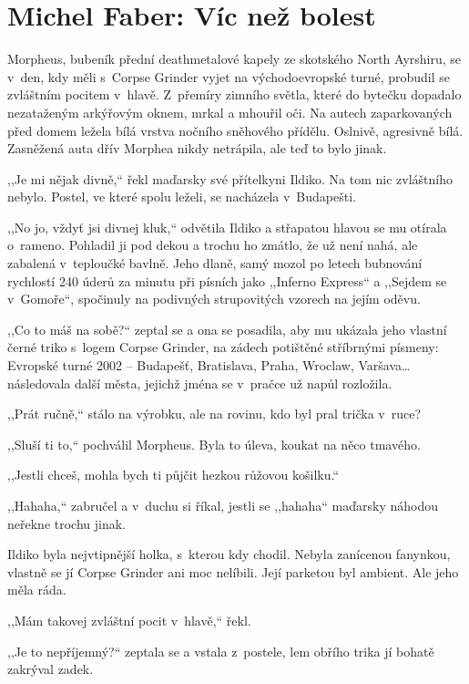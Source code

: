 \section{Michel Faber: Víc než bolest}


Morpheus, bubeník přední deathmetalové kapely ze skotského North Ayrshiru, se v den, kdy měli s Corpse Grinder vyjet na východoevropské turné, probudil se zvláštním pocitem v hlavě. Z přemíry zimního světla, které do bytečku dopadalo nezataženým arkýřovým oknem, mrkal a mhouřil oči. Na autech zaparkovaných před domem ležela bílá vrstva nočního sněhového přídělu. Oslnivě, agresivně bílá. Zasněžená auta dřív Morphea nikdy netrápila, ale teď to bylo jinak.

,,Je mi nějak divně,`` řekl maďarsky své přítelkyni Ildiko. Na tom nic zvláštního nebylo. Postel, ve které spolu leželi, se nacházela v Budapešti.

,,No jo, vždyť jsi divnej kluk,`` odvětila Ildiko a střapatou hlavou se mu otírala o~rameno. Pohladil ji pod dekou a trochu ho zmátlo, že už není nahá, ale zabalená v teploučké bavlně. Jeho dlaně, samý mozol po letech bubnování rychlostí 240 úderů za minutu při písních jako ,,Inferno Express`` a ,,Sejdem se v Gomoře``, spočinuly na podivných strupovitých vzorech na jejím oděvu.

,,Co to máš na sobě?`` zeptal se a ona se posadila, aby mu ukázala jeho vlastní černé triko s logem Corpse Grinder, na zádech potištěné stříbrnými písmeny: Evropské turné 2002 – Budapešť, Bratislava, Praha, Wroclaw, Varšava\ldots následovala další města, jejichž jména se v pračce už napůl rozložila.

,,Prát ručně,`` stálo na výrobku, ale na rovinu, kdo byl pral trička v ruce?

,,Sluší ti to,`` pochválil Morpheus. Byla to úleva, koukat na něco tmavého.

,,Jestli chceš, mohla bych ti půjčit hezkou růžovou košilku.``

,,Hahaha,`` zabručel a v duchu si říkal, jestli se ,,hahaha`` maďarsky náhodou neřekne trochu jinak.

Ildiko byla nejvtipnější holka, s kterou kdy chodil. Nebyla zanícenou fanynkou, vlastně se jí Corpse Grinder ani moc nelíbili. Její parketou byl ambient. Ale jeho měla ráda.

,,Mám takovej zvláštní pocit v hlavě,`` řekl.

,,Je to nepříjemný?`` zeptala se a vstala z postele, lem obřího trika jí bohatě zakrýval zadek.

